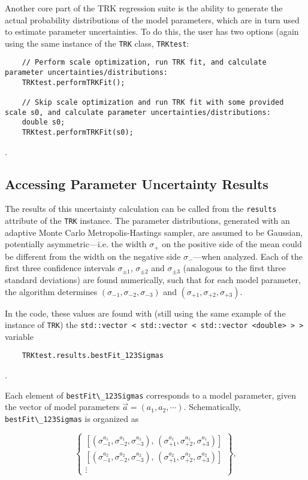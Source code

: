 \documentclass[12pt]{article}
\newcommand{\li}{\lstinline}
\begin{document}
Another core part of the TRK regression suite is the ability to generate the actual probability distributions of the model parameters, which are in turn used to estimate parameter uncertainties. To do this, the user has two options (again using the same instance of the \li{TRK} class, \li{TRKtest}:

\begin{lstlisting}
    // Perform scale optimization, run TRK fit, and calculate parameter uncertainties/distributions:
    TRKtest.performTRKFit();
    
    // Skip scale optimization and run TRK fit with some provided scale s0, and calculate parameter uncertainties/distributions:
    double s0;
    TRKtest.performTRKFit(s0);
\end{lstlisting}.

\subsection{Accessing Parameter Uncertainty Results}
The results of this uncertainty calculation can be called from the \li{results} attribute of the \li{TRK} instance. The parameter distributions, generated with an adaptive Monte Carlo Metropolis-Hastings sampler, are assumed to be Gaussian, potentially asymmetric---i.e. the width $\sigma_+$ on the positive side of the mean could be different from the width on the negative side $\sigma_-$---when analyzed. Each of the first three confidence intervals $\sigma_{\pm1}$, $\sigma_{\pm2}$ and $\sigma_{\pm3}$ (analogous to the first three standard deviations) are found numerically, such that for each model parameter, the algorithm determines $(\sigma_{-1}, \sigma_{-2}, \sigma_{-3})$ and $(\sigma_{+1}, \sigma_{+2}, \sigma_{+3})$. 

In the code, these values are found with (still using the same example of the instance of \li{TRK}) the \li{std::vector < std::vector < std::vector <double> > >} variable

\begin{lstlisting}
    TRKtest.results.bestFit_123Sigmas
\end{lstlisting}.

Each element of \li{bestFit\_123Sigmas} corresponds to a model parameter, given the vector of model parameters $\vec{a}=(a_1,a_2,\cdots)$. Schematically, \li{bestFit\_123Sigmas} is organized as 

\begin{equation}
    \begin{Bmatrix}
        \left[\left(\sigma_{-1}^{a_1}, \sigma_{-2}^{a_1}, \sigma_{-3}^{a_1}\right), \, \left(\sigma_{+1}^{a_1}, \sigma_{+2}^{a_1}, \sigma_{+3}^{a_1}\right)\right] \\
        \left[\left(\sigma_{-1}^{a_2}, \sigma_{-2}^{a_2}, \sigma_{-3}^{a_2}\right), \, \left(\sigma_{+1}^{a_2}, \sigma_{+2}^{a_2}, \sigma_{+3}^{a_2}\right)\right] \\
        \vdots
    \end{Bmatrix},
\end{equation}
\end{document}
